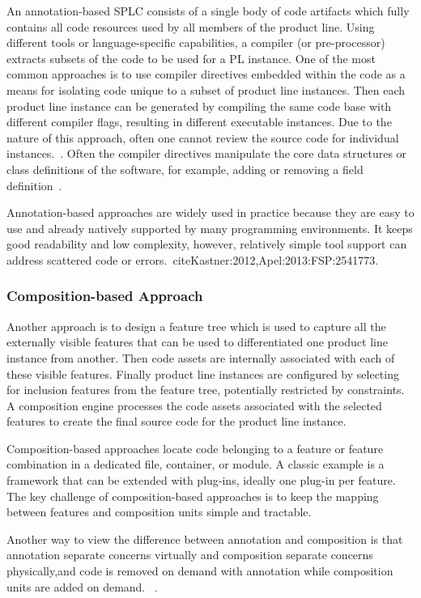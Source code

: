 An annotation-based SPLC consists of a single body of code artifacts
which fully contains all code resources used by all members of the
product line. Using different tools or language-specific capabilities, a
compiler (or pre-processor) extracts subsets of the code to be used for
a PL instance. One of the most common approaches is to use compiler
directives embedded within the code as a means for isolating code unique
to a subset of product line instances. Then each product line instance
can be generated by compiling the same code base with different compiler
flags, resulting in different executable instances. Due to the nature of
this approach, often one cannot review the source code for individual
instances.~\cite{Apel:2013:FSP:2541773}. Often the compiler directives
manipulate the core data structures or class definitions of the
software, for example, adding or removing a field definition~\cite{Liebig:2010:AVF:1806799.1806819}.

Annotation-based approaches are widely used in practice because they are
easy to use and already natively supported by many programming
environments. It keeps good readability and low complexity, however,
relatively simple tool support can address scattered code or
errors.~cite{Kastner:2012,Apel:2013:FSP:2541773}.


\subsubsection{Composition-based Approach}

Another approach is to design a feature tree which is used to capture all the externally visible features that
can be used to differentiated one product line instance from another. Then code assets are internally associated
 with each of these visible features. Finally product line instances are configured by selecting for inclusion
  features from the feature tree, potentially restricted by constraints. A composition engine processes the
  code assets associated with the selected features to create the final source code for the product line instance.

Composition-based approaches locate code belonging to a feature or feature combination in a dedicated file,
container, or module. A classic example is a framework that can be extended with plug-ins, ideally one plug-in
per feature. The key challenge of composition-based approaches is to keep the mapping between features and
composition units simple and tractable.

Another way to view the difference between annotation and composition is that annotation separate concerns
virtually and composition separate concerns physically,and code is removed on demand with annotation while
composition units are added on demand. ~\cite{Thum:2014:FEF:2537169.2537315,Apel:2013:FSP:2541773}.

